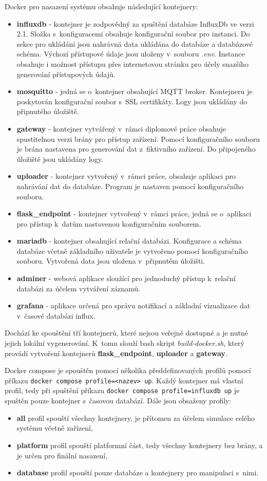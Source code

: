 Docker pro nasazení systému obsahuje následující kontejnery: 
\begin{itemize}
    \item \textbf{influxdb} - kontejner je zodpovědný za spuštění databáze InfluxDb ve verzi 2.1. Složka s~konfiguracemi obsahuje konfigurační soubor pro instanci. Do sekce pro ukládání jsou nahrávná data ukládána do databáze a databázové schéma. Výchozí přístupové údaje jsou uloženy v~souboru \textit{.env}. Instance obsahuje i možnost přístupu přes internetovou stránku pro účely snazšího generování přístupových údajů.
    \item \textbf{mosquitto} - jedná se o~kontejner obsahující MQTT broker. Kontejneru je poskytován konfigurační soubor s~SSL certifikáty. Logy jsou ukládány do připnutého úložiště.
    \item \textbf{gateway} - kontejner vytvářený v~rámci diplomové práce obsahuje spustitelnou verzi brány pro přístup zařízení. Pomocí konfiguračního souboru je brána nastavena pro generování dat z~fiktivního zařízení. Do připojeného úložiště jsou ukládány logy.
    \item \textbf{uploader} - kontejner vytvořený v~rámci práce, obsahuje aplikaci pro nahrávání dat do databáze. Program je nastaven pomocí konfiguračního souboru.
    \item \textbf{flask\_endpoint} - kontejner vytvořený v~rámci práce, jedná se o~aplikaci pro přístup k~datům nastavenou konfiguračním souborem. 
    \item \textbf{mariadb} - kontejner obsahující relační databázi. Konfigurace a schéma databáze včetně základního uživatele je vytvořeno pomocí konfiguračního souboru. Vytvořená data jsou uložena v~připnutém úložišti.
    \item \textbf{adminer} - webová aplikace sloužící pro jednoduchý přístup k~relační databázi za účelem vytváření záznamů. 
    \item \textbf{grafana} - aplikace určená pro správu notifikací a základní vizualizace dat v~časové databázi influx. 
\end{itemize}
Dochází ke spouštění tří kontejnerů, které nejsou veřejně dostupné a je nutné jejich lokální vygenerování. K~tomu slouží bash skript \textit{build-docker.sh}, který provádí vytvoření kontejnerů \textbf{flask\_endpoint}, \textbf{uploader} a \textbf{gateway}.

Docker compose je spouštěn pomocí několika předdefinovaných profilů pomocí příkazu \texttt{docker compose \-\-profile=<nazev> up}. Každý kontejner má vlastní profil, tedy při spuštění příkazu \texttt{docker compose \-\-profile=influxdb up} je spuštěn pouze kontejner s~časovou databází. Dále jsou obsaženy profily:
\begin{itemize}
    \item \textbf{all} profil spouští všechny kontejnery, je přítomen za účelem simulace celého systému včetně zařízení,
    \item \textbf{platform} profil spouští platformní část, tedy všechny kontejnery bez brány, a je určen pro finální nasazení,
    \item \textbf{database} profil spouští pouze databáze a kontejnery pro manipulaci s~nimi.
\end{itemize}

